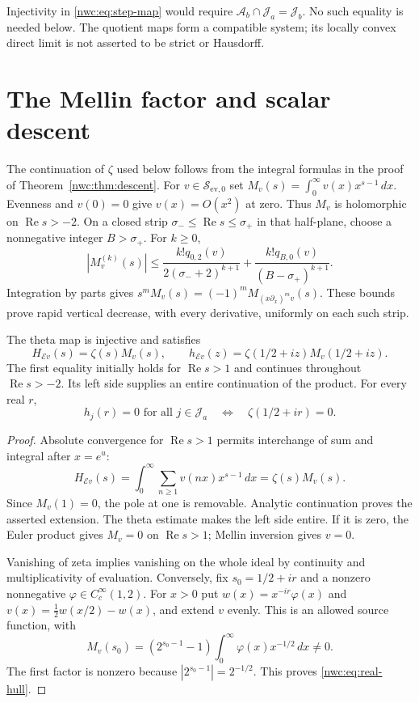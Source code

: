Injectivity in \eqref{nwc:eq:step-map} would require
$\mathcal A_b\cap\mathcal J_a=\mathcal J_b$.
No such equality is needed below. The quotient maps form a compatible
system; its locally convex direct limit is not asserted to be strict
or Hausdorff.

\section{The Mellin factor and scalar descent}

The continuation of $\zeta$ used below follows from the integral formulas in the
proof of Theorem~\ref{nwc:thm:descent}.
For $v\in\mathcal S_{\mathrm{ev},0}$ set
$M_v(s)=\int_0^\infty v(x)x^{s-1}\,dx$.
Evenness and $v(0)=0$ give $v(x)=O(x^2)$ at zero.
Thus $M_v$ is holomorphic on $\operatorname{Re}s>-2$.
On a closed strip $\sigma_-\leq\operatorname{Re}s\leq\sigma_+$
in that half-plane, choose a nonnegative integer $B>\sigma_+$.
For $k\geq0$,
\[
 |M_v^{(k)}(s)|\leq
 \frac{k!q_{0,2}(v)}{2(\sigma_-+2)^{k+1}}
 +\frac{k!q_{B,0}(v)}{(B-\sigma_+)^{k+1}}.
\]
Integration by parts gives
$s^mM_v(s)=(-1)^mM_{(x\partial_x)^mv}(s)$.
These bounds prove rapid vertical decrease, with every derivative,
uniformly on each such strip.

\begin{lemma}\label{nwc:lem:mellin}
The theta map is injective and satisfies
\begin{equation}\label{nwc:eq:mellin-factor}
 H_{\mathcal Ev}(s)=\zeta(s)M_v(s),\qquad
 h_{\mathcal Ev}(z)=\zeta(1/2+iz)M_v(1/2+iz).
\end{equation}
The first equality initially holds for $\operatorname{Re}s>1$ and
continues throughout $\operatorname{Re}s>-2$.
Its left side supplies an entire continuation of the product.
For every real $r$,
\begin{equation}\label{nwc:eq:real-hull}
 h_j(r)=0\text{ for all }j\in\mathcal J_a
 \quad\Longleftrightarrow\quad \zeta(1/2+ir)=0.
\end{equation}
\end{lemma}
\begin{proof}
Absolute convergence for $\operatorname{Re}s>1$ permits interchange
of sum and integral after $x=e^u$:
\[
 H_{\mathcal Ev}(s)=\int_0^\infty\sum_{n\geq1}v(nx)x^{s-1}\,dx
                  =\zeta(s)M_v(s).
\]
Since $M_v(1)=0$, the pole at one is removable.
Analytic continuation proves the asserted extension.
The theta estimate makes the left side entire.
If it is zero, the Euler product gives $M_v=0$ on
$\operatorname{Re}s>1$; Mellin inversion gives $v=0$.

Vanishing of zeta implies vanishing on the whole ideal by continuity
and multiplicativity of evaluation.
Conversely, fix $s_0=1/2+ir$ and a nonzero nonnegative
$\varphi\in C_c^\infty(1,2)$.
For $x>0$ put $w(x)=x^{-ir}\varphi(x)$ and
$v(x)=\frac12w(x/2)-w(x)$, and extend $v$ evenly.
This is an allowed source function, with
\[
 M_v(s_0)=(2^{s_0-1}-1)\int_0^\infty\varphi(x)x^{-1/2}\,dx\ne0.
\]
The first factor is nonzero because $|2^{s_0-1}|=2^{-1/2}$.
This proves \eqref{nwc:eq:real-hull}.
\end{proof}

